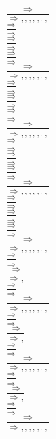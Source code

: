 \documentclass[11pt]{article}
\begin{document}
\begin{center}
\bigskip
\\$\frac{\Rightarrow }{\Rightarrow , , , , , , , }$
\bigskip
\\$\frac{\Rightarrow }{\Rightarrow }$
\bigskip
\\$\frac{\Rightarrow }{\Rightarrow }$
\bigskip
\\$\frac{\Rightarrow }{\Rightarrow }$
\bigskip
\\$\frac{\Rightarrow }{\Rightarrow , , , , , , , }$
\bigskip
\\$\frac{\Rightarrow }{\Rightarrow }$
\bigskip
\\$\frac{\Rightarrow }{\Rightarrow }$
\bigskip
\\$\frac{\Rightarrow }{\Rightarrow }$
\bigskip
\\$\frac{\Rightarrow }{\Rightarrow , , , , , , , }$
\bigskip
\\$\frac{\Rightarrow }{\Rightarrow }$
\bigskip
\\$\frac{\Rightarrow }{\Rightarrow }$
\bigskip
\\$\frac{\Rightarrow }{\Rightarrow }$
\bigskip
\\$\frac{\Rightarrow }{\Rightarrow , , , , , , , }$
\bigskip
\\$\frac{\Rightarrow }{\Rightarrow }$
\bigskip
\\$\frac{\Rightarrow }{\Rightarrow }$
\bigskip
\\$\frac{\Rightarrow }{\Rightarrow }$
\bigskip
\\$\frac{\Rightarrow }{\Rightarrow , , , , , , , }$
\bigskip
\\$\frac{\Rightarrow }{\Rightarrow }$
\bigskip
\\$\frac{\Rightarrow }{\Rightarrow , }$
\bigskip
\\$\frac{\Rightarrow }{\Rightarrow }$
\bigskip
\\$\frac{\Rightarrow }{\Rightarrow , , , , , , , }$
\bigskip
\\$\frac{\Rightarrow }{\Rightarrow }$
\bigskip
\\$\frac{\Rightarrow }{\Rightarrow , }$
\bigskip
\\$\frac{\Rightarrow }{\Rightarrow }$
\bigskip
\\$\frac{\Rightarrow }{\Rightarrow , , , , , , , }$
\bigskip
\\$\frac{\Rightarrow }{\Rightarrow }$
\bigskip
\\$\frac{\Rightarrow }{\Rightarrow , }$
\bigskip
\\$\frac{\Rightarrow }{\Rightarrow }$
\bigskip
\\$\frac{\Rightarrow }{\Rightarrow , , , , , , , }$

\end{center}
\end{document}
